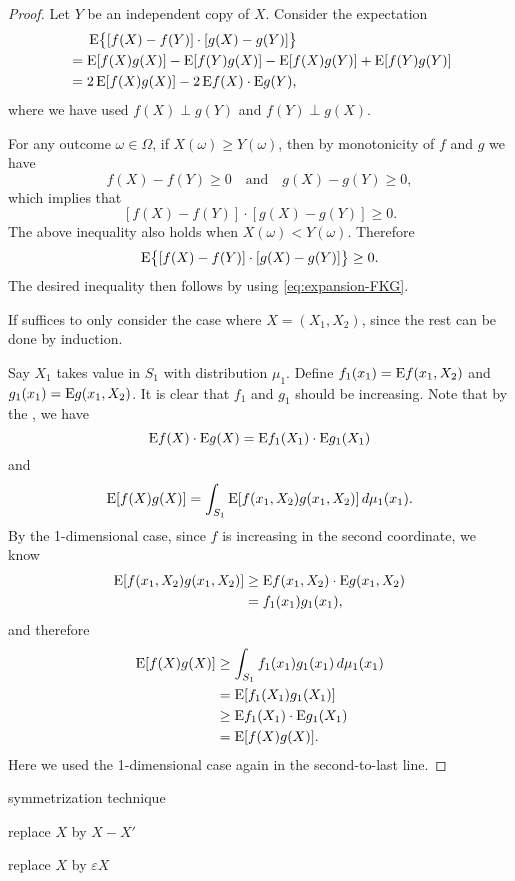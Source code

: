 \begin{proof}
Let $Y$ be an independent copy of $X$. Consider the expectation 
\begin{align}
    &\phantom{{}={}}\E\bigl\{ [f(X) - f(Y)]\cdot [g(X) - g(Y)]\bigr\}\nonumber \\ 
    & = \E[f(X)g(X)] - \E [f(Y) g(X)] - \E [f(X) g(Y)] + \E[f(Y)g(Y)]\nonumber \\ 
    & = 2 \E[f(X)g(X)] - 2 \E f(X) \cdot \E g(Y), \label{eq:expansion-FKG}
\end{align}
where we have used \( f(X) \perp g(Y) \) and \( f(Y) \perp g(X) \).

For any outcome \( \omega \in \Omega \), if \( X(\omega) \geq Y(\omega) \), then by monotonicity of \( f \) and \( g \) we have 
\[
f(X) - f(Y) \geq 0 \quad \text{and} \quad g(X) - g(Y) \geq 0,
\]
which implies that 
\[
[f(X) - f(Y)]\cdot [g(X) - g(Y)] \geq 0.
\]
The above inequality also holds when \( X(\omega) < Y(\omega) \). Therefore
\[
\mathop{}\!\mathrm{E}\bigl\{ [f(X) - f(Y)] \cdot [g(X) - g(Y)] \bigr\} \geq 0.
\]
The desired inequality then follows by using \eqref{eq:expansion-FKG}.

If suffices to only consider the case where $X = (X_1,X_2)$, since the rest can be done by induction. 

Say $X_1$ takes value in $S_1$ with distribution $\mu_1$. Define $f_1(x_1) = \mathop{}\!\mathrm{E} f(x_1,X_2)$ and $g_1(x_1) = \mathop{}\!\mathrm{E} g(x_1,X_2)$. It is clear that $f_1$ and $g_1$ should be increasing. Note that by the , we have \[
    \mathop{}\!\mathrm{E} f(X)\cdot \mathop{}\!\mathrm{E} g(X) = \mathop{}\!\mathrm{E} f_1(X_1)\cdot \mathop{}\!\mathrm{E} g_1(X_1)
\] and \[
    \mathop{}\!\mathrm{E}[f(X)g(X)] = \int_{S_1} \mathop{}\!\mathrm{E} [f(x_1,X_2) g(x_1,X_2)]\,d\mu_1(x_1).
\] By the 1-dimensional case, since $f$ is increasing in the second coordinate, we know \begin{align*}
    \mathop{}\!\mathrm{E} [f(x_1,X_2) g(x_1,X_2)] & \geq \mathop{}\!\mathrm{E} f(x_1,X_2)\cdot\mathop{}\!\mathrm{E} g(x_1,X_2) \\ 
    & = f_1(x_1)  g_1(x_1),
\end{align*} and therefore \begin{align*}
    \mathop{}\!\mathrm{E}[f(X)g(X)] & \geq \int_{S_1} f_1(x_1)  g_1(x_1)\,d\mu_1(x_1) \\
    & = \mathop{}\!\mathrm{E} [f_1(X_1)g_1(X_1)]\\
    & \geq \mathop{}\!\mathrm{E} f_1(X_1) \cdot \mathop{}\!\mathrm{E} g_1(X_1) \\
    & = \mathop{}\!\mathrm{E}[f(X)g(X)].
\end{align*}
Here we used the 1-dimensional case again in the second-to-last line.
\end{proof}

symmetrization technique 


replace $X$ by $X - X'$

replace $X$ by $\varepsilon X$